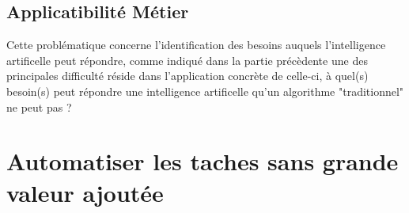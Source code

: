         \section{Applicatibilité Métier}
            Cette problématique concerne l'identification des besoins auquels l'intelligence artificelle 
            peut répondre, comme indiqué dans la partie précèdente une des principales difficulté réside 
            dans l'application concrète de celle-ci, à quel(s) besoin(s) peut répondre une 
            intelligence artificelle qu'un algorithme "traditionnel" ne peut pas ? 




    \chapter{Automatiser les taches sans grande valeur ajoutée}


